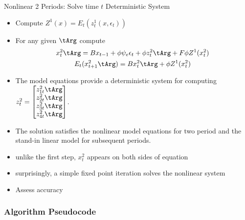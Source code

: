 \documentclass[12pt]{article}
\begin{document}



  {Nonlinear 2 Periods: Solve time $t$ Deterministic
    System }
{\small
  \begin{itemize}
  \item Compute $Z^1(x)= E_t(z^1_t(x,\epsilon_t))$
  \item For any given $\tArg$ 
compute
{\small
  \begin{gather}
    x_t^2\tArg=B x_{t-1} + \phi \psi_e\epsilon_t + \phi z^2_t\tArg + F \phi Z^1(x^2_t) \label{bothS}\\
    E_t(x^2_{t+1}\tArg)=B x^2_{t}\tArg+ \phi Z^1(x^2_t)
  \end{gather}
}
\item The model equations provide a deterministic system  for computing $  z^2_t=\begin{bmatrix}
    z^2_{1t}\tArg\\
    z^2_{2t}\tArg\\
    z^2_{3t}\tArg\\
    z^2_{4t}\tArg
  \end{bmatrix}$.
\item The solution satisfies the nonlinear model equations for two 
period and the stand-in linear model for subsequent periods.
\item unlike the first step, $x^2_t$ appears on both sides of equation 
\item  surprisingly, a simple fixed point iteration solves the nonlinear system
\item Assess accuracy
  \end{itemize}
}

\subsubsection{Algorithm Pseudocode}
\label{sec:pseudocode}
\end{document}
